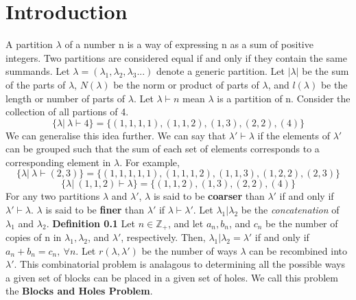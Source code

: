 \documentclass[12pt]{article}
\begin{document}
\section{Introduction}
A partition \(\lambda\) of a number n is a way of expressing n as a sum of positive integers. Two partitions are considered equal if and only if they contain the same summands. Let \(\lambda = (\lambda_1, \lambda_2, \lambda_3...)\) denote a generic partition. Let \(|\lambda|\) be the sum of the parts of \(\lambda\), \(N(\lambda)\) be the norm or product of parts of \(\lambda\), and \(l(\lambda)\) be the length or number of parts of \(\lambda\). Let \(\lambda \vdash n\) mean \(\lambda\) is a partition of n.
\newline
Consider the collection of all partions of 4.
\[\{\lambda|\ \lambda \vdash 4\}=\{(1,1,1,1),(1,1,2),(1,3),(2,2),(4)\}\]
We can generalise this idea further. We can say that \(\lambda' \vdash \lambda\) if the elements of \(\lambda'\) can be grouped such that the sum of each set of elements corresponds to a corresponding element in \(\lambda\).
For example,
\[\{\lambda|\ \lambda \vdash (2,3)\} = \{(1,1,1,1,1),(1,1,1,2),(1,1,3),(1,2,2),(2,3)\}\]
\[\{\lambda|\ (1,1,2) \vdash \lambda\} = \{(1,1,2),(1,3),(2,2),(4)\}\]
For any two partitions \(\lambda\) and \(\lambda'\), \(\lambda\) is said to be \textbf{coarser} than \(\lambda'\) if and only if \(\lambda' \vdash \lambda\). \(\lambda\) is said to be \textbf{finer} than \(\lambda'\) if \(\lambda \vdash \lambda'\). \newline \newline
Let \(\lambda_1|\lambda_2\) be the \textit{concatenation} of \(\lambda_1\) and \(\lambda_2\).
\newline
\textbf{Definition 0.1} \newline
Let \(n \in \mathbb{Z}_+\), and let \(a_n,b_n\), and \(c_n\) be the number of copies of n in \(\lambda_1,\lambda_2\), and \(\lambda'\), respectively. Then, \(\lambda_1|\lambda_2 = \lambda'\) if and only if \(a_n+b_n=c_n,\ \forall n\).
\newline \newline
Let \(r(\lambda, \lambda')\) be the number of ways \(\lambda\) can be recombined into \(\lambda'\).
\newline \newline
This combinatorial problem is analagous to determining all the possible ways a given set of blocks can be placed in a given set of holes. We call this problem the \textbf{Blocks and Holes Problem}.
\newpage
\end{document}
